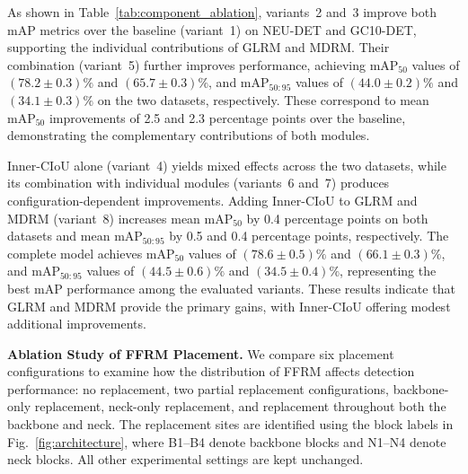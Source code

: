 \documentclass[pdflatex,sn-nature]{sn-jnl}
\begin{document}
As shown in Table~\ref{tab:component_ablation}, variants~2 and~3 improve both mAP metrics over the baseline (variant~1) on NEU-DET and GC10-DET, supporting the individual contributions of GLRM and MDRM. Their combination (variant~5) further improves performance, achieving $\mathrm{mAP}_{50}$ values of $(78.2 \pm 0.3)\%$ and $(65.7 \pm 0.3)\%$, and $\mathrm{mAP}_{50:95}$ values of $(44.0 \pm 0.2)\%$ and $(34.1 \pm 0.3)\%$ on the two datasets, respectively. These correspond to mean $\mathrm{mAP}_{50}$ improvements of 2.5 and 2.3 percentage points over the baseline, demonstrating the complementary contributions of both modules.

Inner-CIoU alone (variant~4) yields mixed effects across the two datasets, while its combination with individual modules (variants~6 and~7) produces configuration-dependent improvements. Adding Inner-CIoU to GLRM and MDRM (variant~8) increases mean $\mathrm{mAP}_{50}$ by 0.4 percentage points on both datasets and mean $\mathrm{mAP}_{50:95}$ by 0.5 and 0.4 percentage points, respectively. The complete model achieves $\mathrm{mAP}_{50}$ values of $(78.6 \pm 0.5)\%$ and $(66.1 \pm 0.3)\%$, and $\mathrm{mAP}_{50:95}$ values of $(44.5 \pm 0.6)\%$ and $(34.5 \pm 0.4)\%$, representing the best mAP performance among the evaluated variants. These results indicate that GLRM and MDRM provide the primary gains, with Inner-CIoU offering modest additional improvements.



\noindent\textbf{Ablation Study of FFRM Placement.}
We compare six placement configurations to examine how the distribution of FFRM affects detection performance: no replacement, two partial replacement configurations, backbone-only replacement, neck-only replacement, and replacement throughout both the backbone and neck. The replacement sites are identified using the block labels in Fig.~\ref{fig:architecture}, where B1--B4 denote backbone blocks and N1--N4 denote neck blocks. All other experimental settings are kept unchanged.
\end{document}
